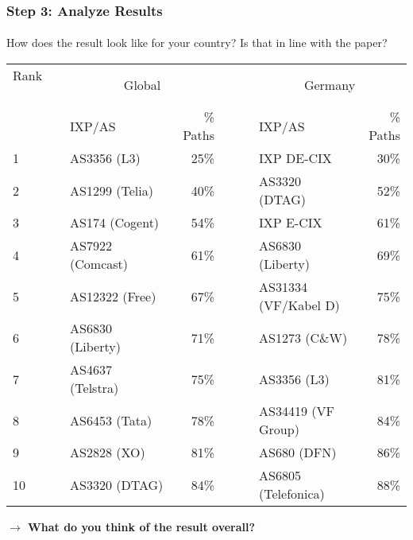 \clearpage
\begin{frame}
\frametitle{Step 3: Analyze Results}
\framesubtitle{}

How does the result look like for your country? Is that in line with the paper?
\begin{table}[!h]%
	\centering		
	{\begin{tabular}{llrclr}
			\toprule
			Rank ~~~~~& \multicolumn{2}{c}{Global} && \multicolumn{2}{c}{Germany}	\\
			\cmidrule{2-3} \cmidrule{5-6}
			& IXP/AS  & \textSigma\% Paths &~~~& IXP/AS & \textSigma\% Paths   \\
			\midrule
			1 & AS3356 (L3)  & 25\%  && IXP DE-CIX & 30\% \\
			2 & AS1299 (Telia) & 40\%  && AS3320 (DTAG) & 52\% \\
			3 & AS174 (Cogent)  & 54\%  && IXP E-CIX & 61\% \\
			4 & AS7922 (Comcast)~~~  & 61\%  && AS6830 (Liberty) ~~~& 69\% \\
			5 & AS12322 (Free)  & 67\%  && AS31334 (VF/Kabel D) & 75\%\\
			6 & AS6830 (Liberty)  & 71\%  && AS1273 (C\&W)& 78\%\\
			7 & AS4637 (Telstra) & 75\%  && AS3356 (L3)  & 81\% \\
			8 & AS6453 (Tata) & 78\%  && AS34419 (VF Group)& 84\% \\
			9 & AS2828 (XO)  & 81\%  && AS680 (DFN) & 86\% \\
			10 & AS3320 (DTAG) & 84\% && AS6805 (Telefonica) & 88\% \\
			\bottomrule
	\end{tabular}}
\end{table}

\pause
\textbf{$\rightarrow$ What do you think of the result overall?}
\end{frame}
\clearpage


